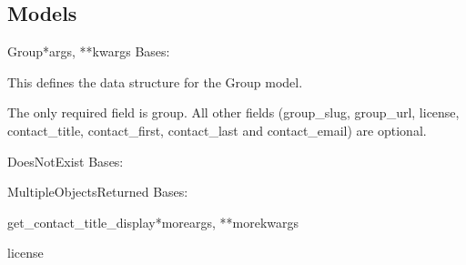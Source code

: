 \documentclass[letterpaper,10pt,english]{sphinxmanual}
\begin{document}
\subsection{Models}
\hypertarget{module-groups.models}{}
\modulesynopsis{}

\hypertarget{groups.models.Group}{}\begin{classdesc}{Group}{*args, **kwargs}
Bases: 

This defines the data structure for the Group model.

The only required field is group.
All other fields (group\_slug, group\_url, license, contact\_title, contact\_first, contact\_last and contact\_email) are optional.

\hypertarget{groups.models.Group.DoesNotExist}{}\begin{excdesc}{DoesNotExist}
Bases: 
\end{excdesc}

\hypertarget{groups.models.Group.MultipleObjectsReturned}{}\begin{excdesc}{MultipleObjectsReturned}
Bases: 
\end{excdesc}

\hypertarget{groups.models.Group.get\_contact\_title\_display}{}\begin{methoddesc}[Group]{get\_contact\_title\_display}{*moreargs, **morekwargs}\end{methoddesc}

\hypertarget{groups.models.Group.license}{}\begin{memberdesc}[Group]{license}\end{memberdesc}
\end{classdesc}
\end{document}
